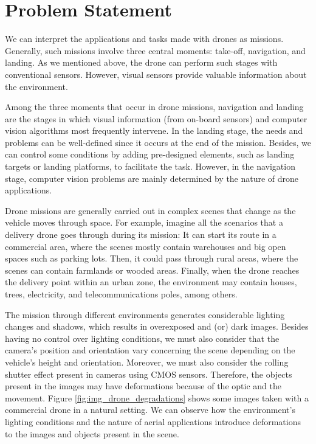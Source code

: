 \section*{Problem Statement}
 
We can interpret the applications and tasks made with drones as missions. Generally, such missions involve three central moments: take-off, navigation, and landing. As we mentioned above, the drone can perform such stages with conventional sensors. However, visual sensors provide valuable information about the environment.

Among the three moments that occur in drone missions, navigation and landing are the stages in which visual information (from on-board sensors) and computer vision algorithms most frequently intervene. In the landing stage, the needs and problems can be well-defined since it occurs at the end of the mission. Besides, we can control some conditions by adding pre-designed elements, such as landing targets or landing platforms, to facilitate the task. However, in the navigation stage, computer vision problems are mainly determined by the nature of drone applications.

Drone missions are generally carried out in complex scenes that change as the vehicle moves through space. For example, imagine all the scenarios that a delivery drone goes through during its mission: It can start its route in a commercial area, where the scenes mostly contain warehouses and big open spaces such as parking lots. Then, it could pass through rural areas, where the scenes can contain farmlands or wooded areas. Finally, when the drone reaches the delivery point within an urban zone, the environment may contain houses, trees, electricity, and telecommunications poles, among others. 

The mission through different environments generates considerable lighting changes and shadows, which results in overexposed and (or) dark images. Besides having no control over lighting conditions, we must also consider that the camera's position and orientation vary concerning the scene depending on the vehicle's height and orientation. Moreover, we must also consider the rolling shutter effect present in cameras using CMOS sensors. Therefore, the objects present in the images may have deformations because of the optic and the movement. Figure \ref{fig:img_drone_degradations} shows some images taken with a commercial drone in a natural setting. We can observe how the environment's lighting conditions and the nature of aerial applications introduce deformations to the images and objects present in the scene. 

